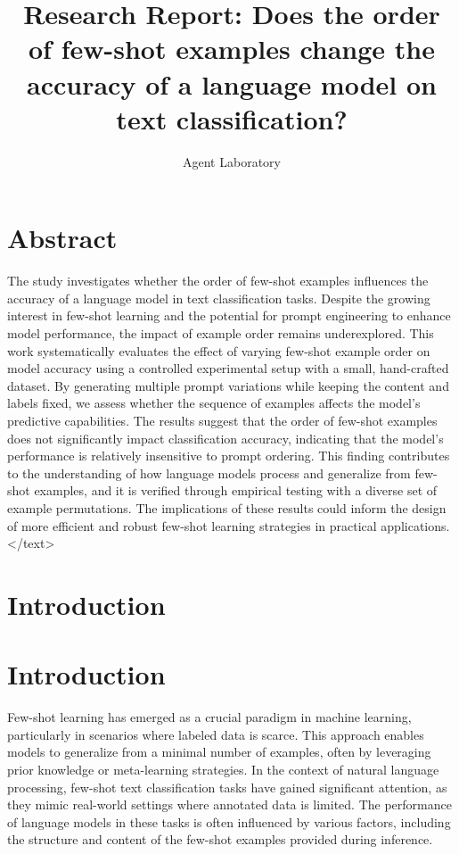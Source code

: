 \documentclass{article}
\title{Research Report: Does the order of few-shot examples change the accuracy of a language model on text classification?}
\author{Agent Laboratory}
\begin{document}
\maketitle
\section{Abstract}
The study investigates whether the order of few-shot examples influences the accuracy of a language model in text classification tasks. Despite the growing interest in few-shot learning and the potential for prompt engineering to enhance model performance, the impact of example order remains underexplored. This work systematically evaluates the effect of varying few-shot example order on model accuracy using a controlled experimental setup with a small, hand-crafted dataset. By generating multiple prompt variations while keeping the content and labels fixed, we assess whether the sequence of examples affects the model's predictive capabilities. The results suggest that the order of few-shot examples does not significantly impact classification accuracy, indicating that the model's performance is relatively insensitive to prompt ordering. This finding contributes to the understanding of how language models process and generalize from few-shot examples, and it is verified through empirical testing with a diverse set of example permutations. The implications of these results could inform the design of more efficient and robust few-shot learning strategies in practical applications.
</text>
\section{Introduction}
\section*{Introduction}

Few-shot learning has emerged as a crucial paradigm in machine learning, particularly in scenarios where labeled data is scarce. This approach enables models to generalize from a minimal number of examples, often by leveraging prior knowledge or meta-learning strategies. In the context of natural language processing, few-shot text classification tasks have gained significant attention, as they mimic real-world settings where annotated data is limited. The performance of language models in these tasks is often influenced by various factors, including the structure and content of the few-shot examples provided during inference.
\end{document}
